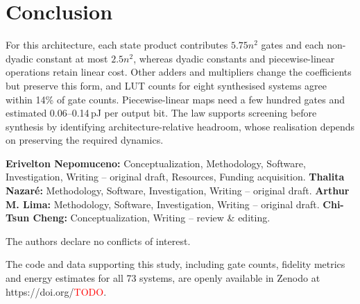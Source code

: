 \documentclass[ASNA,twocolumn]{USG}
\newcommand{\todo}{\textcolor{red}{TODO}}
\begin{document}
\section{Conclusion}\label{sec:conclusion}
For this architecture, each state product contributes $5.75n^2$ gates and each
non-dyadic constant at most $2.5n^2$, whereas dyadic constants and piecewise-linear operations
retain linear cost. Other adders and multipliers change the coefficients but preserve
this form, and LUT counts for eight synthesised systems agree within 14\% of gate counts.
Piecewise-linear maps need a few hundred gates
and estimated 0.06--0.14\,pJ per output bit.
The law supports screening before synthesis by identifying architecture-relative
headroom, whose realisation depends on preserving the required dynamics.

\textbf{Erivelton Nepomuceno:} Conceptualization, Methodology, Software, Investigation,
Writing -- original draft, Resources, Funding acquisition.
\textbf{Thalita Nazar\'e:} Methodology, Software, Investigation, Writing -- original draft.
\textbf{Arthur M. Lima:} Methodology, Software, Investigation, Writing -- original draft.
\textbf{Chi-Tsun Cheng:} Conceptualization, Writing -- review \& editing.


The authors declare no conflicts of interest.

The code and data supporting this study, including gate counts, fidelity metrics and
energy estimates for all 73 systems, are openly available in Zenodo at
https://doi.org/\todo.


\end{document}
